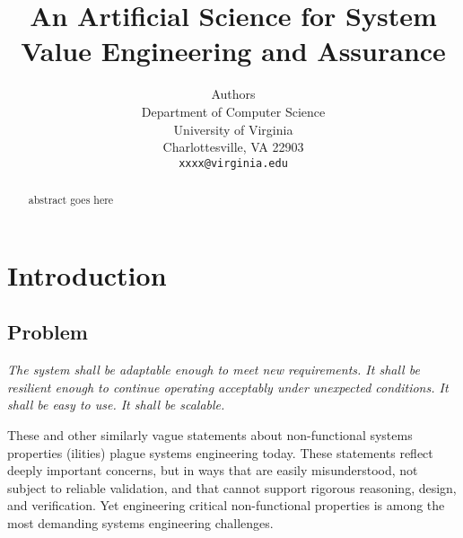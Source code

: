 \documentclass{article} %
\title{An Artificial Science for System Value Engineering and Assurance}
\author{
Authors \\
Department of Computer Science\\
University of Virginia\\
Charlottesville, VA 22903 \\
\texttt{xxxx@virginia.edu}
}
\begin{document}
\maketitle

\begin{abstract}
abstract goes here

\end{abstract}

\section{Introduction}
\subsection{Problem}
\emph{The system shall be adaptable enough to meet new requirements. It shall be resilient enough to continue operating
acceptably under unexpected conditions. It shall be easy to use. It shall be scalable.}

These and other similarly vague statements about non-functional systems properties (ilities) plague systems engineering today. These statements reflect deeply important concerns, but in ways that are easily misunderstood, not subject to reliable validation, and that cannot support rigorous reasoning, design, and verification. Yet engineering critical non-functional properties is among the most demanding systems engineering challenges.
\end{document}
